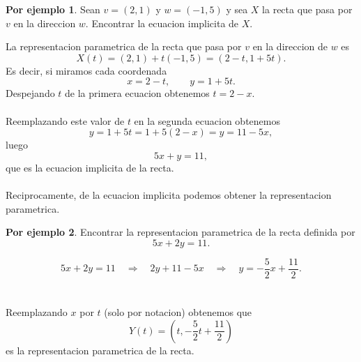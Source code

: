 \documentclass{article}
\theoremstyle{definition}
\theoremstyle{definition}
\newtheorem*{ej}{Por ejemplo}
\theoremstyle{remark}
\begin{document}
\begin{ej}
  Sean $v=(2,1)$ y $w=(-1,5)$ y sea $X$ la recta que pasa por $v$ en la direccion $w$. Encontrar la ecuacion implicita de $X$. 
\end{ej}
La representacion parametrica de la recta que pasa por $v$ en la direccion de $w$ es \[
X(t)=(2,1)+t(-1,5)=(2-t,1+5t).
\]
Es decir, si miramos cada coordenada \[
x=2-t, \quad \quad y=1+5t.
\]
Despejando $t$ de la primera ecuacion obtenemos $t=2-x$.\\\\
Reemplazando este valor de $t$ en la segunda ecuacion obtenemos \[
y=1+5t=1+5(2-x)=y=11-5x,
\]
luego \[
5x+y=11,
\]
que es la ecuacion implicita de la recta.
\\\\
Reciprocamente, de la ecuacion implicita podemos obtener la representacion parametrica.
\begin{ej}
  Encontrar la representacion parametrica de la recta definida por \[
5x+2y=11.
  \]
\end{ej}
$$5x+2y=11 \quad \Rightarrow \quad 2y+11-5x \quad \Rightarrow \quad y = -\frac{5}{2}x+\frac{11}{2}.$$ \\\\
Reemplazando $x$ por $t$ (solo por notacion) obtenemos que \[
  Y(t)=\left(t,-\frac{5}{2}t+\frac{11}{2}\right)
\]
es la representacion parametrica de la recta. \pagebreak
\end{document}
